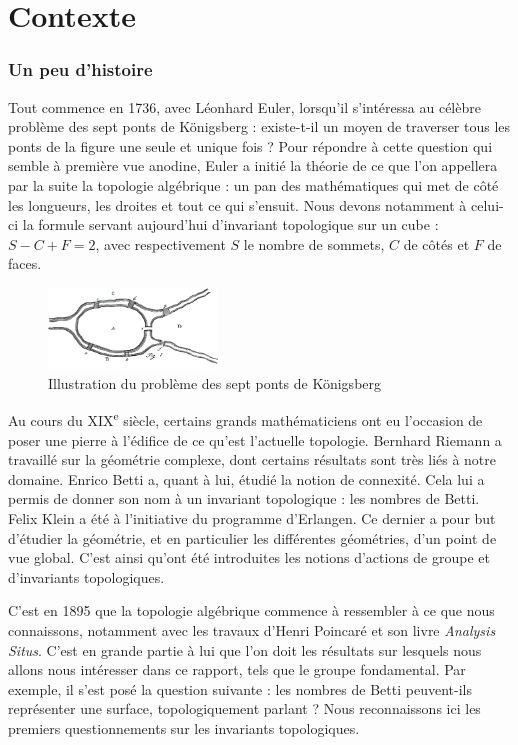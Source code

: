\section{Contexte}

\subsubsection{Un peu d’histoire}

Tout commence en 1736, avec Léonhard Euler, lorsqu’il s’intéressa au célèbre problème des sept ponts de Königsberg : existe-t-il un moyen de traverser tous les ponts de la figure une seule et unique fois ? Pour répondre à cette question qui semble à première vue anodine, Euler a initié la théorie de ce que l’on appellera par la suite la topologie algébrique : un pan des mathématiques qui met de côté les longueurs, les droites et tout ce qui s’ensuit. Nous devons notamment à celui-ci la formule servant aujourd’hui d’invariant topologique sur un cube : $S - C + F = 2$, avec respectivement $S$ le nombre de sommets, $C$ de côtés et $F$ de faces.

\begin{figure}[H]
\centering
\includegraphics[width=0.4\textwidth]{pictures/SevenBridges.png}
\caption{Illustration du problème des sept ponts de Königsberg}
\label{img:seven-bridges}
\end{figure}

Au cours du XIX\textsuperscript{e} siècle, certains grands mathématiciens ont eu l’occasion de poser une pierre à l’édifice de ce qu’est l’actuelle topologie. Bernhard Riemann a travaillé sur la géométrie complexe, dont certains résultats sont très liés à notre domaine. Enrico Betti a, quant à lui, étudié la notion de connexité. Cela lui a permis de donner son nom à un invariant topologique : les nombres de Betti. Felix Klein a été à l’initiative du programme d’Erlangen. Ce dernier a pour but d’étudier la géométrie, et en particulier les différentes géométries, d’un point de vue global. C’est ainsi qu’ont été introduites les notions d’actions de groupe et d’invariants topologiques.

C’est en 1895 que la topologie algébrique commence à ressembler à ce que nous connaissons, notamment avec les travaux d’Henri Poincaré et son livre \textit{Analysis Situs}. C’est en grande partie à lui que l’on doit les résultats sur lesquels nous allons nous intéresser dans ce rapport, tels que le groupe fondamental. Par exemple, il s’est posé la question suivante : les nombres de Betti peuvent-ils représenter une surface, topologiquement parlant ? Nous reconnaissons ici les premiers questionnements sur les invariants topologiques.

